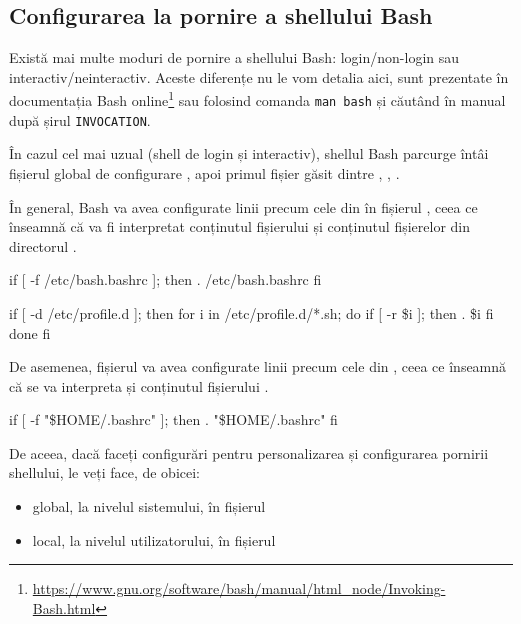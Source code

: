 \subsection{Configurarea la pornire a shellului Bash}
\label{sec:cli:shell-start:config}

Există mai multe moduri de pornire a shellului Bash: login/non-login sau
interactiv/neinteractiv. Aceste diferențe nu le vom detalia aici, sunt
prezentate în documentația Bash online\footnote{\url{https://www.gnu.org/software/bash/manual/html\_node/Invoking-Bash.html}} sau folosind comanda \texttt{man bash} și căutând în manual după șirul \texttt{INVOCATION}.

În cazul cel mai uzual (shell de login și interactiv), shellul Bash parcurge
întâi fișierul global de configurare , apoi primul fișier găsit dintre
, , .

În general, Bash va avea configurate linii precum cele din  în fișierul
, ceea ce înseamnă că va fi interpretat conținutul fișierului
 și conținutul fișierelor din directorul .

\begin{screen}[caption={Secvență de configurare Bash (/etc/profile)},label={lst:cli:etc-profile}]
        if [ -f /etc/bash.bashrc ]; then
            . /etc/bash.bashrc
        fi


if [ -d /etc/profile.d ]; then
    for i in /etc/profile.d/*.sh; do
        if [ -r \$i ]; then
            . \$i
        fi
    done
fi
\end{screen}

De asemenea, fișierul  va avea configurate linii precum cele din , ceea ce înseamnă că se va interpreta și conținutul fișierului .

\begin{screen}[caption={Secvență de configurare Bash (~/.bashrc)},label={lst:cli:home-profile}]
    if [ -f "\$HOME/.bashrc" ]; then
        . "\$HOME/.bashrc"
    fi
\end{screen}

De aceea, dacă faceți configurări pentru personalizarea și configurarea pornirii shellului, le veți face, de obicei:

\begin{itemize}
  \item global, la nivelul sistemului, în fișierul 
  \item local, la nivelul utilizatorului, în fișierul 
\end{itemize}

